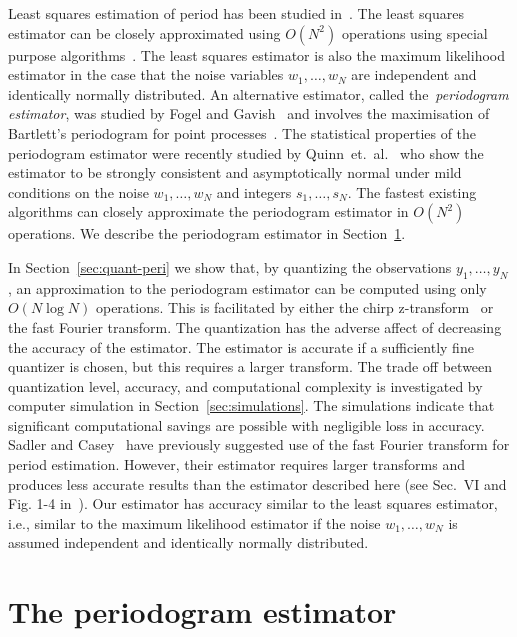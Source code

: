 \documentclass[10pt,twocolumn,twoside]{IEEEtran}
\begin{document}
Least squares estimation of period has been studied in~\cite{Clarkson2007,McKilliam2007,Quinn_sparse_noisy_SSP_2012}.  The least squares estimator can be closely approximated using $O(N^2)$ operations using special purpose algorithms~\cite{McKilliam2009CoxeterLattices,McKilliam2008}.  The least squares estimator is also the maximum likelihood estimator in the case that the noise variables $w_1,\dots,w_N$ are independent and identically normally distributed.  An alternative estimator, called the~\emph{periodogram estimator}, was studied by Fogel and Gavish~\cite{Fogel1988,Fogel1989_bit_synch_zero_crossings} and involves the maximisation of Bartlett's periodogram for point processes~\cite{Bartlest_periodgram_point_process_1963}.  The statistical properties of the periodogram estimator were recently studied by Quinn~et.~al.~\cite{Quinn20013asilomar_period_est} who show the estimator to be strongly consistent and asymptotically normal under mild conditions on the noise $w_1,\dots,w_N$ and integers $s_1,\dots,s_N$.  The fastest existing algorithms can closely approximate the periodogram estimator in $O(N^2)$ operations.  We describe the periodogram estimator in Section~\ref{sec:peri-estim}.

In Section~\ref{sec:quant-peri} we show that, by quantizing the observations $y_1,\dots,y_N$, an approximation to the periodogram estimator can be computed using only $O(N\log N)$ operations.  This is facilitated by either the chirp z-transform~\cite{Rabiner1969} or the fast Fourier transform.  The quantization has the adverse affect of decreasing the accuracy of the estimator.  The estimator is accurate if a sufficiently fine quantizer is chosen, but this requires a larger transform.  The trade off between quantization level, accuracy, and computational complexity is investigated by computer simulation in Section~\ref{sec:simulations}.  The simulations indicate that significant computational savings are possible with negligible loss in accuracy.  Sadler and Casey~\cite{726812} have previously suggested use of the fast Fourier transform for period estimation.  However, their estimator requires larger transforms and produces less accurate results than the estimator described here (see Sec.~VI and Fig. 1-4 in~\cite{726812}).  Our estimator has accuracy similar to the least squares estimator, i.e., similar to the maximum likelihood estimator if the noise $w_1,\dots,w_N$ is assumed independent and identically normally distributed.
 
\section{The periodogram estimator}\label{sec:peri-estim}
\end{document}

